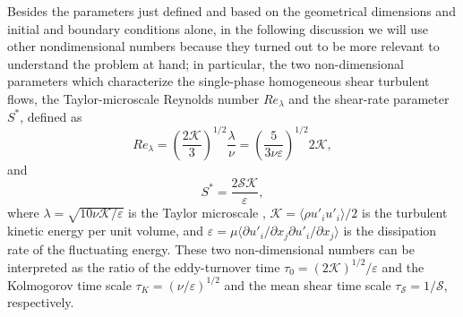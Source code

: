 Besides the parameters just defined and based on the geometrical dimensions and initial and boundary conditions alone, in the following discussion we will use other nondimensional numbers because they turned out to be more relevant to understand the problem at hand; in particular, the two non-dimensional parameters which characterize the single-phase homogeneous shear turbulent flows, the Taylor-microscale Reynolds number $Re_\lambda$ and the shear-rate parameter $S^*$, defined as
\begin{equation}
\label{eq:rel}
Re_\lambda = \left( \frac{2\mathcal{K} }{3} \right)^{1/2} \frac{\lambda}{\nu} = \left( \frac{5}{3 \nu \varepsilon } \right)^{1/2} 2\mathcal{K},
\end{equation}
and
\begin{equation}
\label{eq:ss}
S^* = \frac{2 \mathcal{S} \mathcal{K} }{\varepsilon},
\end{equation}
where $\lambda = \sqrt{10\nu \mathcal{K}/\varepsilon}$ is the Taylor microscale \citep{sekimoto_dong_jimenez_2016a}, $\mathcal{K} = \langle \rho u'_i u'_i \rangle/2$ is the turbulent kinetic energy per unit volume, and $\varepsilon = \mu \langle \partial u'_i/\partial x_j \partial u'_i/\partial x_j \rangle$ is the dissipation rate of the fluctuating energy. These two non-dimensional numbers can be interpreted as the ratio of the eddy-turnover time $\tau_0= \left( 2\mathcal{K} \right)^{1/2}/\varepsilon$ and the Kolmogorov time scale $\tau_K= \left( \nu / \varepsilon \right)^{1/2}$ and the mean shear time scale $\tau_\mathcal{S} = 1/ \mathcal{S}$, respectively.

